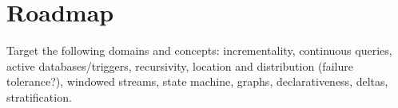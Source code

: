 \documentclass[11pt]{article}
\begin{document}
%

\section*{Roadmap}
Target the following domains and concepts: incrementality, continuous queries, active databases/triggers, recursivity, location and distribution (failure tolerance?), windowed streams, state machine, graphs, declarativeness, deltas, stratification.
\end{document}
